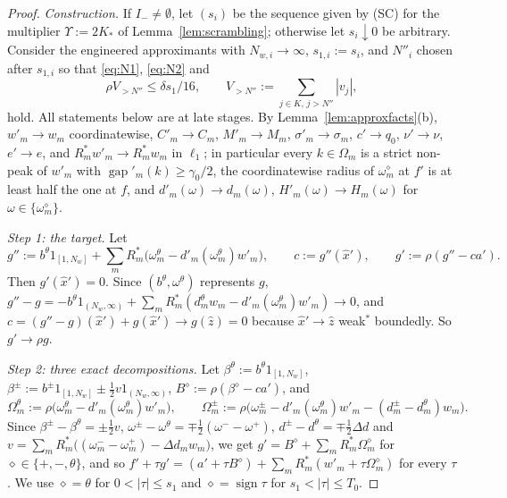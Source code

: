 \documentclass[10pt]{amsart}
\theoremstyle{definition}
\theoremstyle{remark}
\newcommand{\sgn}{\operatorname{sign}}
\newcommand{\gap}{\operatorname{gap}}
\newcommand{\zh}{\hat z}
\begin{document}
\begin{proof}
\emph{Construction.}  If $I_-\ne\emptyset$, let $(s_i)$ be the sequence
given by \textup{(SC)} for the multiplier $\Upsilon:=2K_*$ of
Lemma~\ref{lem:scrambling}; otherwise let $s_i\downarrow0$ be arbitrary.  Consider the engineered approximants with
$N_{w,i}\to\infty$, $s_{1,i}:=s_i$, and $N''_i$ chosen after $s_{1,i}$ so that
\eqref{eq:N1}, \eqref{eq:N2} and
\begin{equation}\label{eq:N3}
 \rho V_{>N''}\le\delta s_1/16,\qquad V_{>N''}:=\sum_{j\in K,\,j>N''}|v_j|,
\end{equation}
hold.  All statements below are at late stages.  By
Lemma~\ref{lem:approxfacts}(b), $w'_m\to w_m$ coordinatewise, $C'_m\to C_m$,
$M'_m\to M_m$, $\sigma'_m\to\sigma_m$, $c'\to q_0$, $\nu'\to\nu$, $e'\to e$,
and $R^*_mw'_m\to R_m^*w_m$ in $\ell_1$; in particular every $k\in\Omega_m$
is a strict non-peak of $w'_m$ with $\gap'_m(k)\ge\gamma_0/2$, the
coordinatewise radius of $\omega^\diamond_m$ at $f'$ is at least half the one
at $f$, and $d'_m(\omega)\to d_m(\omega)$, $H'_m(\omega)\to H_m(\omega)$ for
$\omega\in\{\omega^\diamond_m\}$.

\emph{Step 1: the target.}  Let
\[
 g'':=b^\theta1_{[1,N_w]}+\sum_mR_m^*\big(\omega^\theta_m-d'_m(\omega^\theta_m)
 w'_m\big),\qquad c:=g''(\hat x'),\qquad g':=\rho(g''-ca').
\]
Then $g'(\hat x')=0$.  Since $(b^\theta,\omega^\theta)$ represents $g$,
$g''-g=-b^\theta1_{(N_w,\infty)}+\sum_mR_m^*(d^\theta_mw_m-d'_m(\omega^\theta_m)
w'_m)\to0$, and $c=(g''-g)(\hat x')+g(\hat x')\to g(\zh)=0$ because $\hat
x'\to\zh$ weak$^*$ boundedly.  So $g'\to\rho g$.

\emph{Step 2: three exact decompositions.}  Let
$\beta^\theta:=b^\theta1_{[1,N_w]}$, $\beta^\pm:=b^\pm1_{[1,N_w]}\pm\frac12v
1_{(N_w,\infty)}$, $B^\diamond:=\rho(\beta^\diamond-ca')$, and
\[
 \Omega^\theta_m:=\rho\big(\omega^\theta_m-d'_m(\omega^\theta_m)w'_m\big),\qquad
 \Omega^\pm_m:=\rho\big(\omega^\pm_m-d'_m(\omega^\theta_m)w'_m-(d^\pm_m-
 d^\theta_m)w_m\big).
\]
Since $\beta^\pm-\beta^\theta=\pm\frac12v$, $\omega^\pm-\omega^\theta=
\mp\frac12(\omega^--\omega^+)$, $d^\pm-d^\theta=\mp\frac12\Delta d$ and
$v=\sum_mR_m^*\big((\omega^-_m-\omega^+_m)-\Delta d_mw_m\big)$, we get
$g'=B^\diamond+\sum_mR^*_m\Omega^\diamond_m$ for $\diamond\in\{+,-,\theta\}$, and
so $f'+\tau g'=(a'+\tau B^\diamond)+\sum_mR^*_m(w'_m+\tau\Omega^\diamond_m)$ for
every $\tau$.  We use $\diamond=\theta$ for $0<|\tau|\le s_1$ and
$\diamond=\sgn\tau$ for $s_1<|\tau|\le T_0$.


\end{proof}
\end{document}
